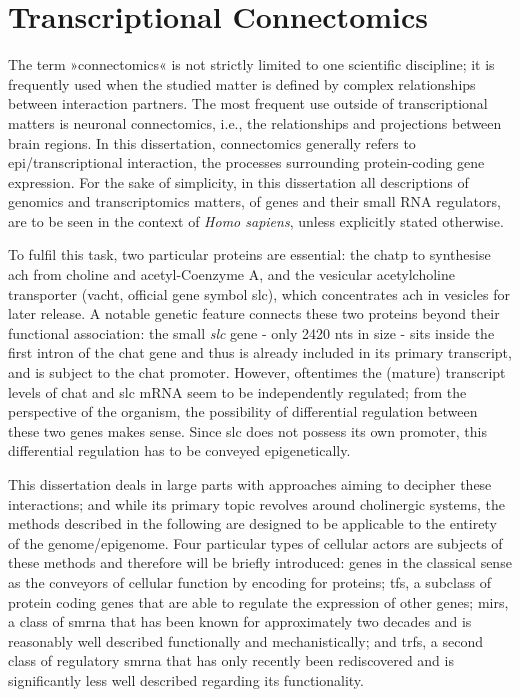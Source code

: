 \section{Transcriptional Connectomics}
The term »connectomics« is not strictly limited to one scientific discipline; it is frequently used when the studied matter is defined by complex relationships between interaction partners. The most frequent use outside of transcriptional matters is neuronal connectomics, i.e., the relationships and projections between brain regions. In this dissertation, connectomics generally refers to epi\-/transcriptional interaction, the processes surrounding protein-coding gene expression. For the sake of simplicity, in this dissertation all descriptions of genomics and transcriptomics matters, of genes and their small RNA regulators, are to be seen in the context of \textit{Homo sapiens}, unless explicitly stated otherwise.

 To fulfil this task, two particular proteins are essential: the \acf{chatp} to synthesise \ac{ach} from choline and acetyl-Coenzyme A, and the vesicular acetylcholine transporter (\acs{vacht}, official gene symbol \acs{slc}), which concentrates \ac{ach} in vesicles for later release. A notable genetic feature connects these two proteins beyond their functional association: the small \textit{\ac{slc}} gene - only 2420 \acp{nt} in size - sits inside the first intron of the \ac{chat} gene and thus is already included in its primary transcript, and is subject to the \ac{chat} promoter. However, oftentimes the (mature) transcript levels of \ac{chat} and \ac{slc} mRNA seem to be independently regulated; from the perspective of the organism, the possibility of differential regulation between these two genes makes sense. Since \ac{slc} does not possess its own promoter, this differential regulation has to be conveyed epigenetically. 

This dissertation deals in large parts with approaches aiming to decipher these interactions; and while its primary topic revolves around cholinergic systems, the methods described in the following are designed to be applicable to the entirety of the genome/epigenome. Four particular types of cellular actors are subjects of these methods and therefore will be briefly introduced: genes in the classical sense as the conveyors of cellular function by encoding for proteins; \acp{tf}, a subclass of protein coding genes that are able to regulate the expression of other genes; \acp{mir}, a class of \ac{smrna} that has been known for approximately two decades and is reasonably well described functionally and mechanistically; and \acp{trf}, a second class of regulatory \ac{smrna} that has only recently been rediscovered and is significantly less well described regarding its functionality.

